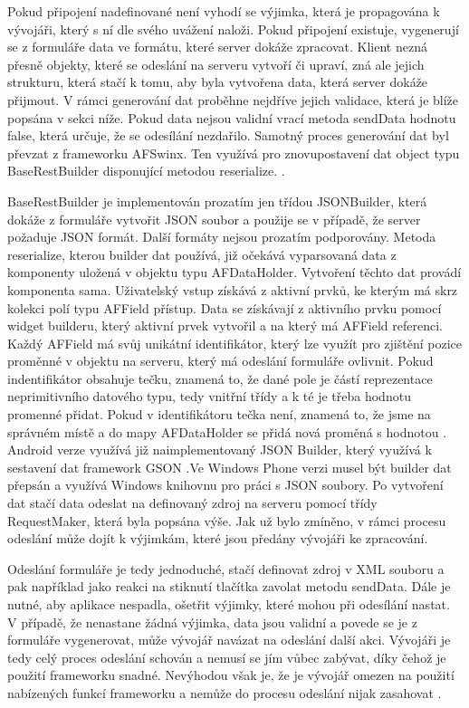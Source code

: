 Pokud připojení nadefinované není vyhodí se výjimka, která je propagována k vývojáři, který s ní dle svého uvážení naloži. Pokud připojení existuje, vygenerují se z formuláře data ve formátu, které server dokáže zpracovat. Klient nezná přesně objekty, které se odeslání na serveru vytvoří či upraví, zná ale jejich strukturu, která stačí k tomu, aby byla vytvořena data, která server dokáže přijmout. V rámci generování dat proběhne nejdříve jejich validace, která je blíže popsána v sekci níže. Pokud data nejsou validní vrací metoda sendData hodnotu false, která určuje, že se odesílání nezdařilo. Samotný proces generování dat byl převzat z frameworku AFSwinx. Ten využívá pro znovupostavení dat object typu BaseRestBuilder disponující metodou reserialize. \cite{tomasek-thesis}. 

BaseRestBuilder je implementován prozatím jen třídou JSONBuilder, která dokáže z formuláře vytvořit JSON soubor a použije se v případě, že server požaduje JSON formát. Další formáty nejsou prozatím podporovány. Metoda reserialize, kterou builder dat používá, již očekává vyparsovaná data z komponenty uložená v objektu typu AFDataHolder. Vytvoření těchto dat provádí komponenta sama. Uživatelský vstup získává z aktivní prvků, ke kterým má skrz kolekci polí typu AFField přístup. Data se získávají z aktivního prvku pomocí widget builderu, který aktivní prvek vytvořil a na který má AFField referenci.  Každý AFField má svůj unikátní identifikátor, který lze využít pro zjištění pozice proměnné v objektu na serveru, který má odeslání formuláře ovlivnit. Pokud indentifikátor obsahuje tečku, znamená to, že dané pole je částí reprezentace neprimitivního datového typu, tedy vnitřní třídy a k té je třeba hodnotu promenné přidat. Pokud v identifikátoru tečka není, znamená to, že jsme na správném místě a do mapy AFDataHolder se přidá nová proměná s hodnotou \cite{tomasek-thesis}. Android verze využívá již naimplementovaný JSON Builder, který využívá k sestavení dat framework GSON \cite{gson}.Ve Windows Phone verzi musel být builder dat přepsán a využívá Windows knihovnu pro práci s JSON soubory. Po vytvoření dat stačí data odeslat na definovaný zdroj na serveru pomocí třídy RequestMaker, která byla popsána výše. Jak už bylo zmíněno, v rámci procesu odeslání může dojít k výjimkám, které jsou předány vývojáři ke zpracování. 

Odeslání formuláře je tedy jednoduché, stačí definovat zdroj v XML souboru a pak například jako reakci na stiknutí tlačítka zavolat metodu sendData. Dále je nutné, aby aplikace nespadla, ošetřit výjimky, které mohou při odesílání nastat. V případě, že nenastane žádná výjimka, data jsou validní a povede se je z formuláře vygenerovat, může vývojář navázat na odeslání další akci. Vývojáři je tedy celý proces odeslání schován a nemusí se jím vůbec zabývat, díky čehož je použití frameworku snadné. Nevýhodou však je, že je vývojář omezen na použití nabízených funkcí frameworku a nemůže do procesu odeslání nijak zasahovat \cite{tomasek-thesis}. 


